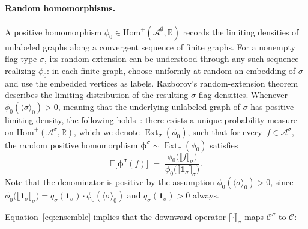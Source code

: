 \documentclass{article}
\newcommand{\poshom}[1]{\mathrm{Hom}^+(\mathcal{A}^{#1}, \mathbb{R})}
\newcommand{\Ext}{\operatorname{Ext}}
\begin{document}
\paragraph{Random homomorphisms.}
A positive homomorphism $\phi_0 \in \poshom{\emptyset}$ records the limiting
densities of unlabeled graphs along a convergent sequence of finite graphs.
For a nonempty flag type $\sigma$, its random extension can be understood
through any such sequence realizing $\phi_0$: in each finite graph, choose
uniformly at random an embedding of $\sigma$ and use the embedded vertices as
labels.  Razborov's random-extension theorem describes the limiting
distribution of the resulting $\sigma$-flag densities.
Whenever $\phi_0(\langle\sigma\rangle_0) > 0$, meaning that the underlying
unlabeled graph of $\sigma$ has positive limiting density, the following
holds~\cite{razborov2007flag}:
there exists a unique probability measure on $\poshom{\sigma}$,
which we denote $\Ext_\sigma(\phi_0)$,
such that for every~$f \in \mathcal{A}^\sigma$, the random positive
homomorphism $\boldsymbol{\phi}^\sigma \sim \Ext_\sigma(\phi_0)$ satisfies
\begin{equation}\label{eq:ensemble}
  \mathbb{E}\bigl[\boldsymbol{\phi}^\sigma(f)\bigr]
  \;=\;
  \frac{\phi_0\bigl(\llbracket f \rrbracket_\sigma\bigr)}
       {\phi_0\bigl(\llbracket \mathbf{1}_\sigma \rrbracket_\sigma\bigr)}.
\end{equation}
Note that the denominator is positive by the assumption
$\phi_0(\langle\sigma\rangle_0)>0$, since
$\phi_0\bigl(\llbracket \mathbf{1}_\sigma \rrbracket_\sigma\bigr)
=q_\sigma(\mathbf{1}_\sigma)\cdot
\phi_0(\langle\sigma\rangle_0)$ and $q_\sigma(\mathbf{1}_\sigma)>0$ always.

Equation~\eqref{eq:ensemble} implies that the downward operator $\llbracket \cdot \rrbracket_\sigma$ maps $\mathcal{C}^\sigma$ to $\mathcal{C}$:
\end{document}
